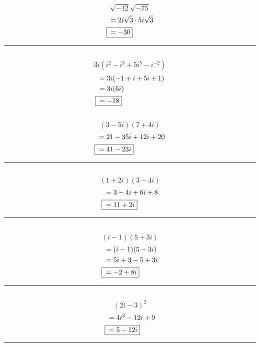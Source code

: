 	\subsection{}
		\[\sqrt{-12}\sqrt{-75}\]
		\begin{align*}
			&= 2i\sqrt{3} \cdot 5i\sqrt{3} \\
			\Aboxed{{} &= -30}
		\end{align*}
		\hrule{}

	\subsection{}
		\[3i(i^2 - i^3 + 5i^5 - i^{-2})\]
		\begin{align*}
			&= 3i(-1 + i + 5i + 1) \\
			&= 3i(6i) \\
			\Aboxed{{} &= -18}
		\end{align*}

	\subsection{}
		\[(3 - 5i)(7 + 4i)\]
		\begin{align*}
			&= 21 - 35i + 12i + 20 \\
			\Aboxed{{} &= 41 - 23i}
		\end{align*}
		\hrule{}

	\subsection{}
		\[(1 + 2i)(3 - 4i)\]
		\begin{align*}
			&= 3 - 4i + 6i + 8 \\
			\Aboxed{{} &= 11 + 2i}
		\end{align*}
		\hrule{}

	\subsection{}
		\[(i - 1)\overline{(5 + 3i)}\]
		\begin{align*}
			&= (i - 1)(5 - 3i) \\
			&= 5i + 3 - 5 + 3i \\
			\Aboxed{{} &= -2 + 8i}
		\end{align*}
		\hrule{}

	\subsection{}
		\[{(2i - 3)}^2\]
		\begin{align*}
			&= 4i^2 - 12i + 9 \\
			\Aboxed{{} &= 5 - 12i}
		\end{align*}
		\hrule{}

